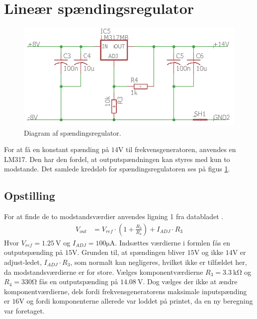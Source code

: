 \section{Lineær spændingsregulator}\label{sec:lm317}
\begin{figure}[h!]
	\centering
	\includegraphics[width=1\textwidth]{billeder/voltage_regulator.png}
	\caption{Diagram af spændingsregulator.}
	\label{fig:voltage_regulator}
\end{figure}
For at få en konstant spænding på $14\si{\volt}$ til frekvensgeneratoren, anvendes en LM317. Den har den fordel, at outputspændningen kan styres med kun to modstande. Det samlede kredsløb for spændingsregulatoren ses på figus \ref{fig:voltage_regulator}.
\subsection{Opstilling}
For at finde de to modstandsværdier anvendes ligning 1 fra databladet \cite[Side. 10]{LM317}.
\begin{align}
	V_{out} & = V_{ref} \cdot \left( 1 + \frac{R_3}{R_4} \right) + I_{ADJ} \cdot R_3 \label{eq:lm317_formel}
\end{align}
Hvor $V_{ref} = \SI{1.25}{\volt}$ og $I_{ADJ} = 100\si{\micro\ampere}$. Indsættes værdierne i formlen fås en outputspænding på $15\si{\volt}$. Grunden til, at spændingen bliver $15\si{\volt}$ og ikke $14\si{\volt}$ er adjust-ledet, $I_{ADJ} \cdot R_3$, som normalt kan negligeres, hvilket ikke er tilfældet her, da modstandsværdierne er for store. Vælges komponentværdierne $R_3 = \SI{3.3}{\kilo\ohm}$ og $R_4 = 330\si{\ohm}$ fås en outputspænding på $\SI{14.08}{\volt}$. Dog vælges der ikke at ændre komponentværdierne, dels fordi frekvensgeneratorens maksimale inputspænding er $16\si{\volt}$ og fordi komponenterne allerede var loddet på printet, da en ny beregning var foretaget.